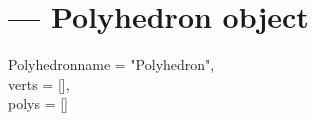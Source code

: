 
\section{ ---
         Polyhedron object}

\begin{classdesc}{Polyhedron}{name = "Polyhedron",\\ 
                              verts = [],\\
                              polys = []
			     }	

\end{classdesc}


